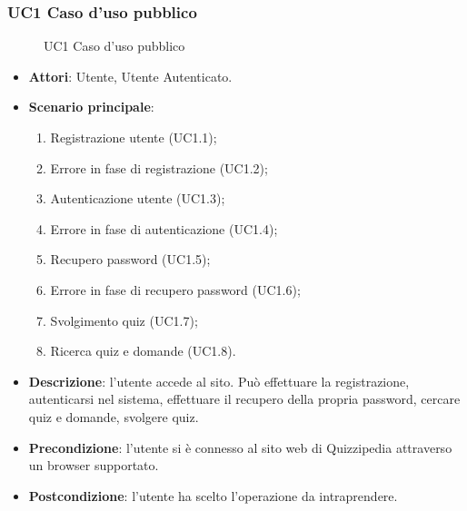 \subsubsection{UC1 Caso d'uso pubblico}
\begin{figure}[H]
\centering
\noindent{}
\caption{UC1 Caso d'uso pubblico}
\end{figure}
\begin{itemize}
\item \textbf{Attori}: Utente, Utente Autenticato.
\item \textbf{Scenario principale}:
\begin{enumerate}
\item Registrazione utente (UC1.1);
\item Errore in fase di registrazione (UC1.2);
\item Autenticazione utente (UC1.3);
\item Errore in fase di autenticazione (UC1.4);
\item Recupero password (UC1.5);
\item Errore in fase di recupero password (UC1.6);
\item Svolgimento quiz (UC1.7);
\item Ricerca quiz e domande (UC1.8).
\end{enumerate}
\item \textbf{Descrizione}: l'utente accede al sito. Può effettuare la registrazione, autenticarsi nel sistema, effettuare il recupero della propria password, cercare quiz e domande, svolgere quiz.
\item \textbf{Precondizione}: l'utente si è connesso al sito web di Quizzipedia attraverso un browser supportato.
\item \textbf{Postcondizione}: l'utente ha scelto l'operazione da intraprendere.
\end{itemize}
